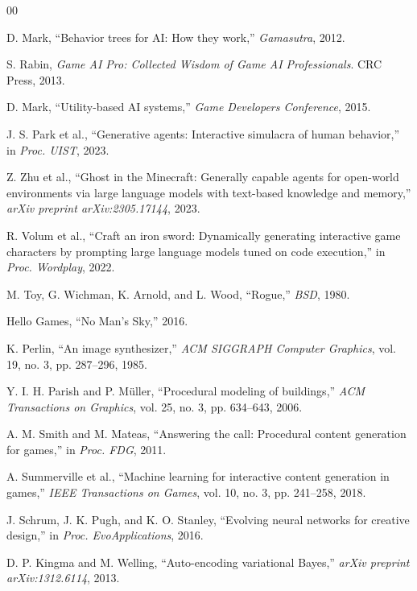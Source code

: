 \documentclass[conference]{IEEEtran}
\begin{document}
\begin{thebibliography}{00}

 D. Mark, ``Behavior trees for AI: How they work,'' \emph{Gamasutra}, 2012.

 S. Rabin, \emph{Game AI Pro: Collected Wisdom of Game AI Professionals}. CRC Press, 2013.

 D. Mark, ``Utility-based AI systems,'' \emph{Game Developers Conference}, 2015.

 J. S. Park et al., ``Generative agents: Interactive simulacra of human behavior,'' in \emph{Proc. UIST}, 2023.

 Z. Zhu et al., ``Ghost in the Minecraft: Generally capable agents for open-world environments via large language models with text-based knowledge and memory,'' \emph{arXiv preprint arXiv:2305.17144}, 2023.

 R. Volum et al., ``Craft an iron sword: Dynamically generating interactive game characters by prompting large language models tuned on code execution,'' in \emph{Proc. Wordplay}, 2022.

 M. Toy, G. Wichman, K. Arnold, and L. Wood, ``Rogue,'' \emph{BSD}, 1980.

 Hello Games, ``No Man's Sky,'' 2016.

 K. Perlin, ``An image synthesizer,'' \emph{ACM SIGGRAPH Computer Graphics}, vol. 19, no. 3, pp. 287--296, 1985.

 Y. I. H. Parish and P. Müller, ``Procedural modeling of buildings,'' \emph{ACM Transactions on Graphics}, vol. 25, no. 3, pp. 634--643, 2006.

 A. M. Smith and M. Mateas, ``Answering the call: Procedural content generation for games,'' in \emph{Proc. FDG}, 2011.

 A. Summerville et al., ``Machine learning for interactive content generation in games,'' \emph{IEEE Transactions on Games}, vol. 10, no. 3, pp. 241--258, 2018.

 J. Schrum, J. K. Pugh, and K. O. Stanley, ``Evolving neural networks for creative design,'' in \emph{Proc. EvoApplications}, 2016.

 D. P. Kingma and M. Welling, ``Auto-encoding variational Bayes,'' \emph{arXiv preprint arXiv:1312.6114}, 2013.


\end{thebibliography}
\end{document}
